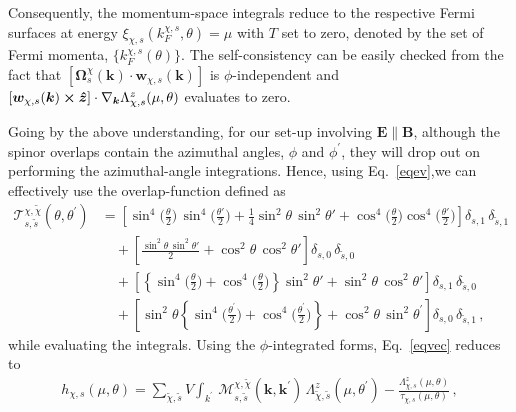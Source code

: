 \documentclass[aps,prb,onecolumn,nofootinbib,citeautoscript,10pt]{revtex4-2}
\def \nn{\nonumber \\}
\begin{document}
Consequently, the momentum-space integrals reduce to the respective Fermi surfaces at energy $\xi_{\chi , s} 
(k_F^{\chi, s} , \theta )= \mu $ with $T$ set to zero, denoted by the set of Fermi momenta, $ \lbrace k_F^{\chi, s} (\theta) \rbrace $. The self-consistency can be easily checked from the fact that $\left [ {\boldsymbol \Omega}^\chi_{s} (\boldsymbol k) \cdot
 {\boldsymbol{w}}_{\chi, s} (\boldsymbol k)  \right ] $ is $\phi$-independent and $ \left [  {\boldsymbol{w}}_{\chi, s} 
 (\boldsymbol k)  \cross   \boldsymbol{\hat z}  \right ] 
\cdot \nabla_{\boldsymbol k} {\Lambda}^z_{\chi, s} (\mu, \theta ) $ evaluates to zero.


Going by the above understanding, for our set-up involving $ {\boldsymbol E}  \parallel {\boldsymbol B} $, 
although the spinor overlaps contain the azimuthal angles,
$\phi$ and $\phi^\prime $, they will drop out on performing the azimuthal-angle integrations. Hence, using Eq.~\eqref{eqev},we can effectively use the overlap-function defined as 
\begin{align}
\label{eqoverlap}
{\mathcal T }^{\chi, \tilde \chi}_{ s, \tilde s} (\theta, \theta^\prime)
& = \left [
\sin ^4\bigg(\frac{\theta }{2}\bigg) \, \sin ^4\bigg (\frac{\theta '}{2}\bigg )
+\frac{1}{4} \sin ^2 \theta  \, \sin ^2 \theta'
+ \cos ^4\bigg(\frac{\theta }{2}\bigg ) \cos^4\bigg (\frac{\theta '}{2}\bigg )
\right ] \delta_{s,1} \, \delta_{\tilde s, 1}
 \nn & \quad 
+ \left [
\frac{ \sin ^2 \theta \, \sin ^2 \theta ' }{2} 
+\cos ^2 \theta \, \cos ^2 \theta '
\right ] \delta_{s,0} \, \delta_{\tilde s, 0}
\nn & \quad + \left [ 
\left\lbrace \sin ^4\bigg (\frac{\theta }{2}\bigg )
+ \cos ^4\bigg( \frac{\theta }{2}\bigg )
\right \rbrace \sin ^2 \theta '
+\sin ^2 \theta \, \cos ^2\theta '  \right ]   \delta_{s,1} \, \delta_{\tilde s, 0} 
\nn & \quad + \left [ 
 \sin ^2 \theta 
\left\lbrace \sin ^4\bigg (\frac{\theta^\prime }{2}\bigg )
+ \cos ^4 \bigg( \frac{\theta ^\prime}{2}\bigg )
\right \rbrace
+\cos ^2\theta \, \sin ^2 \theta^\prime  \right ]  
\delta_{s,0} \, \delta_{\tilde s, 1} \,,
\end{align}
while evaluating the integrals. Using the $\phi$-integrated forms, Eq.~\eqref{eqvec} reduces to
\begin{align}
\label{eq_lambda_mu}
h_{\chi, s} (\mu, \theta) = 
 \sum_{\tilde \chi , \tilde s} V  
\int_{k^\prime }\, \mathcal{M}^{\chi, \tilde \chi}_{ s, \tilde s} 
(\boldsymbol k,\boldsymbol k^\prime)
\, {\Lambda}^z_{ \tilde \chi, \tilde s} ( \mu, \theta^\prime ) 
 - \frac{ {\Lambda}^z_{\chi, s}  (\mu, \theta)} 
{\tau_{\chi, s}(\mu, \theta)}  \,,
\end{align}
\end{document}
